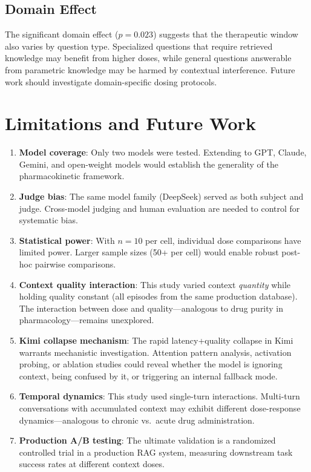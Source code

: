 \documentclass[11pt,a4paper]{article}
\begin{document}
\subsection{Domain Effect}

The significant domain effect ($p = 0.023$) suggests that the therapeutic window also varies by question type. Specialized questions that require retrieved knowledge may benefit from higher doses, while general questions answerable from parametric knowledge may be harmed by contextual interference. Future work should investigate domain-specific dosing protocols.

\section{Limitations and Future Work}

\begin{enumerate}[leftmargin=*, itemsep=3pt]
  \item \textbf{Model coverage}: Only two models were tested. Extending to GPT, Claude, Gemini, and open-weight models would establish the generality of the pharmacokinetic framework.
  \item \textbf{Judge bias}: The same model family (DeepSeek) served as both subject and judge. Cross-model judging and human evaluation are needed to control for systematic bias.
  \item \textbf{Statistical power}: With $n=10$ per cell, individual dose comparisons have limited power. Larger sample sizes (50+ per cell) would enable robust post-hoc pairwise comparisons.
  \item \textbf{Context quality interaction}: This study varied context \emph{quantity} while holding quality constant (all episodes from the same production database). The interaction between dose and quality---analogous to drug purity in pharmacology---remains unexplored.
  \item \textbf{Kimi collapse mechanism}: The rapid latency+quality collapse in Kimi warrants mechanistic investigation. Attention pattern analysis, activation probing, or ablation studies could reveal whether the model is ignoring context, being confused by it, or triggering an internal fallback mode.
  \item \textbf{Temporal dynamics}: This study used single-turn interactions. Multi-turn conversations with accumulated context may exhibit different dose-response dynamics---analogous to chronic vs.\ acute drug administration.
  \item \textbf{Production A/B testing}: The ultimate validation is a randomized controlled trial in a production RAG system, measuring downstream task success rates at different context doses.
\end{enumerate}
\end{document}
